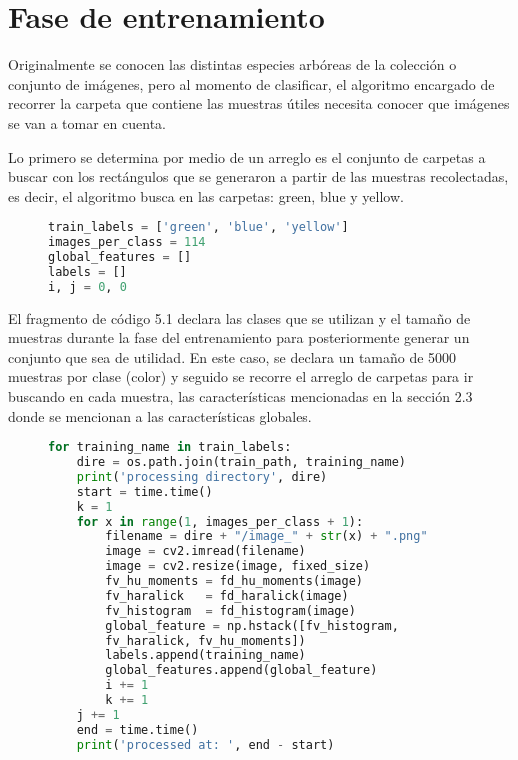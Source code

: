 \section{Fase de entrenamiento}
Originalmente se conocen las distintas especies arbóreas de la colección o conjunto de imágenes, pero al momento de clasificar, el algoritmo encargado de recorrer la carpeta que contiene las muestras útiles  necesita conocer que imágenes se van a tomar en cuenta. 

Lo primero se determina por medio de un arreglo es el conjunto de carpetas a buscar con los rectángulos que se generaron a partir de las muestras recolectadas, es decir, el algoritmo busca en las carpetas: green, blue y yellow. 

\begin{figure}[H]
\centering
\begin{lstlisting}[basicstyle=\small, language=Python, caption=Declaración de variables]
train_labels = ['green', 'blue', 'yellow']
images_per_class = 114 
global_features = []
labels = []
i, j = 0, 0
\end{lstlisting}
\label{Declaracion-variables}
\end{figure}

El fragmento de código 5.1 declara las clases que se utilizan y el tamaño de muestras durante la fase del entrenamiento para posteriormente generar un conjunto que sea de utilidad. En este caso, se declara un tamaño de 5000 muestras por clase (color) y seguido se recorre el arreglo de carpetas para ir buscando en cada muestra, las características mencionadas en la sección 2.3 donde se mencionan a las características globales.

\begin{figure}[H]
\centering
\begin{lstlisting}[basicstyle=\small, language=Python, caption=Código para entrenar modelo]
for training_name in train_labels:
    dire = os.path.join(train_path, training_name)
    print('processing directory', dire)
    start = time.time()
    k = 1
    for x in range(1, images_per_class + 1):
        filename = dire + "/image_" + str(x) + ".png"
        image = cv2.imread(filename)
        image = cv2.resize(image, fixed_size)
        fv_hu_moments = fd_hu_moments(image)
        fv_haralick   = fd_haralick(image)
        fv_histogram  = fd_histogram(image)
        global_feature = np.hstack([fv_histogram, 
        fv_haralick, fv_hu_moments])
        labels.append(training_name)
        global_features.append(global_feature)
        i += 1
        k += 1
    j += 1
    end = time.time()
    print('processed at: ', end - start)
\end{lstlisting}
\label{Recorriendo-folders}
\end{figure}

